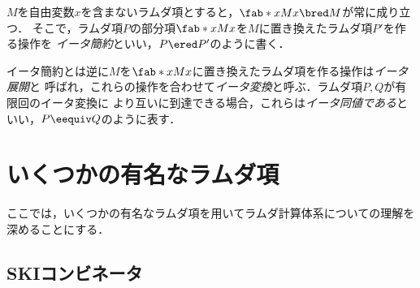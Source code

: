 \documentclass[uplatex,dvipdfmx,report,fleqn]{jsbook}
\begin{document}
\begin{definition}[イータ簡約]
$M$を自由変数$x$を含まないラムダ項とすると，$\fab*{x}{Mx} \bred M$が常に成り立つ．
そこで，ラムダ項$P$の部分項$\fab*{x}{Mx}$を$M$に置き換えたラムダ項$P'$を作る操作を
\emph{イータ簡約}といい，$P\ered P'$のように書く．
\end{definition}
%
イータ簡約とは逆に$M$を$\fab*{x}{Mx}$に置き換えたラムダ項を作る操作は\emph{イータ展開}と
呼ばれ，これらの操作を合わせて\emph{イータ変換}と呼ぶ．ラムダ項$P, Q$が有限回のイータ変換に
より互いに到達できる場合，これらは\emph{イータ同値である}といい，$P\eequiv Q$のように表す．

\section{いくつかの有名なラムダ項}

ここでは，いくつかの有名なラムダ項を用いてラムダ計算体系についての理解を深めることにする．

\subsection{SKIコンビネータ}
\end{document}
